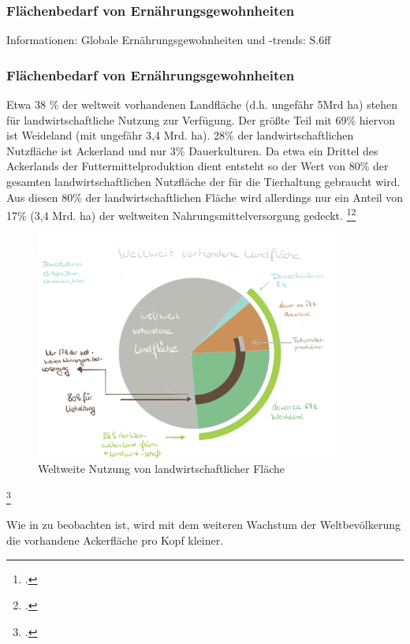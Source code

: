 \documentclass{scrartcl}
\begin{document}
\subsubsection{Flächenbedarf von Ernährungsgewohnheiten}
Informationen: Globale Ernährungsgewohnheiten und -trends: S.6ff

\subsubsection{Flächenbedarf von Ernährungsgewohnheiten}

Etwa 38 \% der weltweit vorhandenen Landfläche (d.h. ungefähr 5Mrd ha) stehen für landwirtschaftliche Nutzung zur Verfügung. Der größte Teil mit 69\% hiervon ist Weideland (mit ungefähr 3,4 Mrd. ha). 28\% der landwirtschaftlichen Nutzfläche ist Ackerland und nur 3\% Dauerkulturen.
Da etwa ein Drittel des Ackerlands der Futtermittelproduktion dient entsteht so der Wert von 80\% der gesamten landwirtschaftlichen Nutzfläche der für die Tierhaltung gebraucht wird. Aus diesen 80\% der landwirtschaftlichen Fläche wird allerdings nur ein Anteil von 17\% (3,4 Mrd. ha) der weltweiten Nahrungsmittelversorgung gedeckt. \footcite{2008FAOSTAT}\footcite[Vgl.][S.6]{VonKoerber2008Globale-trends}


\begin{figure}[htbp]
\centering
\includegraphics[width=10cm]{image_folder/LFlaeche.png}
\caption{Weltweite Nutzung von landwirtschaftlicher Fläche}
\label{fig:lFlaeche}
\end{figure}\footcite[Eigene Darstellung in Anlehnung an]{2008FAOSTAT}

Wie in \label{fig:AckerproKopf} zu beobachten ist, wird mit dem weiteren Wachstum der Weltbevölkerung die vorhandene Ackerfläche pro Kopf kleiner. 
\end{document}
